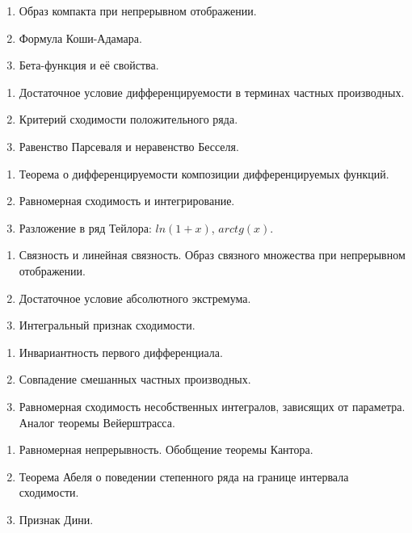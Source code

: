 \documentclass{article}
\newcounter{ticket}[subsection]
\newenvironment{ticket}[1][]{\item[Билет \ifthenelse{\equal{#1}{}}{}{\setcounter{ticket}{#1}}\theticket\refstepcounter{ticket}:]\phantom{}\begin{enumerate}}{\end{enumerate}}
\begin{document}
\begin{description}
\begin{ticket}
	\end{ticket}
	\begin{ticket}
		\item Образ компакта при непрерывном отображении.
		\item Формула Коши-Адамара.
		\item Бета-функция и её свойства.
	\end{ticket}
	\begin{ticket}
		\item Достаточное условие дифференцируемости в терминах
		      частных производных.
		\item Критерий сходимости положительного ряда.
		\item Равенство Парсеваля и неравенство Бесселя.
	\end{ticket}
	\begin{ticket}
		\item Теорема о дифференцируемости композиции дифференцируемых
		      функций.
		\item Равномерная сходимость и интегрирование.
		\item Разложение в ряд Тейлора: $ln(1 + x)$, $arc tg(x)$.
	\end{ticket}
	\begin{ticket}
		\item Связность и линейная связность. Образ связного множества
		      при непрерывном отображении.
		\item Достаточное условие абсолютного экстремума.
		\item Интегральный признак сходимости.
	\end{ticket}
	\begin{ticket}
		\item Инвариантность первого дифференциала.
		\item Совпадение смешанных частных производных.
		\item Равномерная сходимость несобственных интегралов,
		      зависящих от параметра. Аналог теоремы Вейерштрасса.
	\end{ticket}
	\begin{ticket}
		\item Равномерная непрерывность. Обобщение теоремы Кантора.
		\item Теорема Абеля о поведении степенного ряда на границе
		      интервала сходимости.
		\item Признак Дини.
	\end{ticket}
\end{description}
\end{document}
